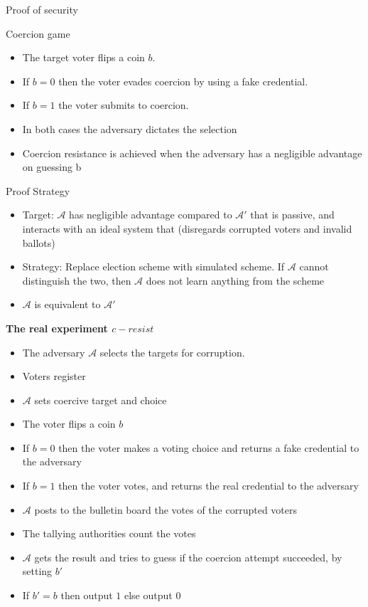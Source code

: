 \documentclass{beamer}
\begin{document}
\begin{frame}[allowframebreaks]{Proof of security}

\begin{block}{Coercion game}
\begin{itemize}
\item The target voter flips a coin $b$. 
\item If $b=0$ then the voter evades coercion by using a fake credential. 
\item If $b=1$ the voter submits to coercion. 
\item In both cases the adversary dictates the selection
\item Coercion resistance is achieved when the adversary has a negligible advantage on guessing b 
\end{itemize}
\end{block}

\begin{block}{Proof Strategy}
\begin{itemize}
\item Target: $\mathcal{A}$ has negligible advantage compared to $\mathcal{A}'$ that is passive, and interacts with an ideal system that (disregards corrupted voters and invalid ballots)
\item Strategy: Replace election scheme with simulated scheme. If $\mathcal{A}$ cannot distinguish the two, then $\mathcal{A}$ does not learn anything from   the scheme
\item $\mathcal{A}$ is equivalent to $\mathcal{A}'$
\end{itemize}

\end{block}

\framebreak
 
\textbf{The real experiment $c-resist$} 
\begin{itemize}
\item The adversary $\mathcal{A}$ selects the targets for corruption.
\item Voters register
\item $\mathcal{A}$ sets coercive target and choice
\item The voter flips a coin $b$
\item If $b=0$ then the voter makes a voting choice and returns a fake credential to the adversary
\item If $b=1$ then the voter votes, and returns the real credential to the adversary
\item $\mathcal{A}$ posts to the bulletin board the votes of the corrupted voters
\item The tallying authorities count the votes
\item $\mathcal{A}$ gets the result and tries to guess if the coercion attempt succeeded, by setting $b'$
\item If $b'=b$ then output $1$ else output $0$
\end{itemize}


\end{frame}
\end{document}
